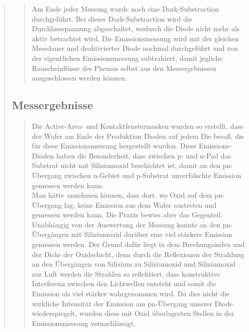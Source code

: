 \begin{quote}
\begin{quote}
        \vspace{1em}
        
        Am Ende jeder Messung wurde noch eine Dark-Substraction durchgeführt.
        Bei dieser Dark-Substraction wird die Durchlassspannung abgeschaltet,
        wodurch die Diode nicht mehr als aktiv betrachtet wird. Die Emissionsmessung wird mit der
        gleichen Messdauer und deaktivierter Diode nochmal durchgeführt und von
        der eigentlichen Emissionsmessung subtrahiert, damit jegliche
        Rauscheinflüsse des Phemos selbst aus den Messergebnissen ausgeschlossen
        werden können. 
        
        \end{quote}
        
        \subsection{Messergebnisse}
        \begin{quote}
        
        Die Active-Area- und Kontaktfenstermasken wurden so erstellt, dass der
        Wafer am Ende der Produktion Dioden auf jedem Die besaß, die für diese
        Emissionsmessung hergestellt wurden. Diese Emissions-Dioden haben die
        Besonderheit, dass zwischen p- und n-Pad das Substrat nicht mit Siliziumoxid beschichtet
        ist, damit an den pn-Übergang zwischen n-Gebiet und p-Substrat
        unverfälschte Emission gemessen werden kann.\\ 
        Man hätte annehmen können, dass dort, wo Oxid auf dem pn-Übergang lag,
        keine Emission aus dem Wafer austreten und gemessen werden kann. Die Praxis bewies aber das
        Gegenteil. Unabhängig von der Auswertung der Messung
        konnte an den pn-Übergängen mit Siliziumoxid darüber eine viel stärkere
        Emission gemessen werden. Der Grund dafür liegt in dem Brechungsindex
        und der Dicke der Oxidschicht, denn durch die Reflexionen der Strahlung an
        den Übergängen von Silizium zu Siliziumoxid und Siliziumoxid zur Luft
        werden die Strahlen so reflektiert, dass konstruktive Interferenz
        zwischen den Lichtwellen entsteht und somit die Emission als viel
        stärker wahrgenommen wird. Da dies nicht die wirkliche Intensität der
        Emission am pn-Übergang unserer Diode wiederspiegelt, wurden diese mit
        Oxid überlagerten Stellen in der Emissionsmessung vernachlässigt.\\
        

\end{quote}
\end{quote}
